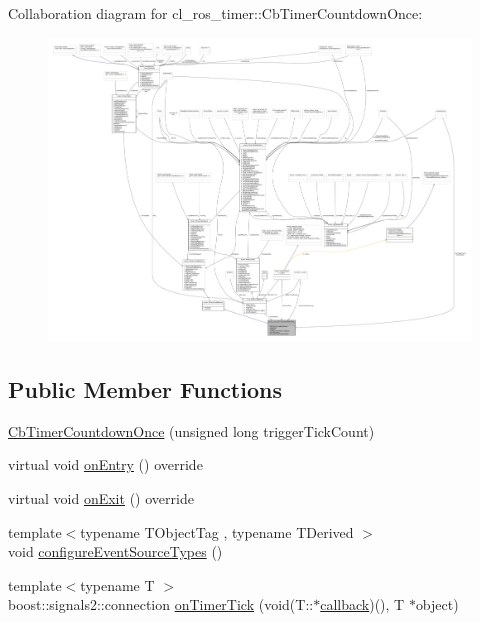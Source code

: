 Collaboration diagram for cl\+\_\+ros\+\_\+timer\+:\+:Cb\+Timer\+Countdown\+Once\+:
\nopagebreak
\begin{figure}[H]
\begin{center}
\leavevmode
\includegraphics[width=350pt]{classcl__ros__timer_1_1CbTimerCountdownOnce__coll__graph}
\end{center}
\end{figure}
\subsection*{Public Member Functions}
\begin{DoxyCompactItemize}
\item 
\hyperlink{classcl__ros__timer_1_1CbTimerCountdownOnce_a41161c36e1c3b1767c02884d28649ccd}{Cb\+Timer\+Countdown\+Once} (unsigned long trigger\+Tick\+Count)
\item 
virtual void \hyperlink{classcl__ros__timer_1_1CbTimerCountdownOnce_a613662c4a4106ece0ce1dee198d1aba2}{on\+Entry} () override
\item 
virtual void \hyperlink{classcl__ros__timer_1_1CbTimerCountdownOnce_ab602b778a299b42e8cc9f4bf3da0a234}{on\+Exit} () override
\item 
{\footnotesize template$<$typename T\+Object\+Tag , typename T\+Derived $>$ }\\void \hyperlink{classcl__ros__timer_1_1CbTimerCountdownOnce_a12c63ab8ca0d90859f6b7fc1212b504e}{configure\+Event\+Source\+Types} ()
\item 
{\footnotesize template$<$typename T $>$ }\\boost\+::signals2\+::connection \hyperlink{classcl__ros__timer_1_1CbTimerCountdownOnce_a1e20a8c9a9907db8a1d7dacf8c60ad27}{on\+Timer\+Tick} (void(T\+::$\ast$\hyperlink{sm__ridgeback__barrel__search__2_2servers_2opencv__perception__node_2opencv__perception__node_8cpp_a050e697bd654facce10ea3f6549669b3}{callback})(), T $\ast$object)
\end{DoxyCompactItemize}
